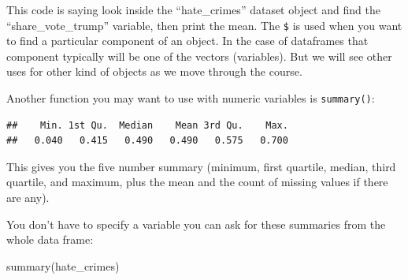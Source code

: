 \documentclass[
]{book}
\newenvironment{Shaded}{\begin{snugshade}}{\end{snugshade}}
\newcommand{\FunctionTok}[1]{\textcolor[rgb]{0.00,0.00,0.00}{#1}}
\newcommand{\NormalTok}[1]{#1}
\newcommand{\SpecialCharTok}[1]{\textcolor[rgb]{0.00,0.00,0.00}{#1}}
\begin{document}
This code is saying look inside the ``hate\_crimes'' dataset object and find the ``share\_vote\_trump'' variable, then print the mean. The \texttt{\$} is used when you want to find a particular component of an object. In the case of dataframes that component typically will be one of the vectors (variables). But we will see other uses for other kind of objects as we move through the course.

Another function you may want to use with numeric variables is \texttt{summary()}:

\begin{Shaded}
\end{Shaded}

\begin{verbatim}
##    Min. 1st Qu.  Median    Mean 3rd Qu.    Max. 
##   0.040   0.415   0.490   0.490   0.575   0.700
\end{verbatim}

This gives you the five number summary (minimum, first quartile, median, third quartile, and maximum, plus the mean and the count of missing values if there are any).

You don't have to specify a variable you can ask for these summaries from the whole data frame:

\begin{Shaded}
\begin{Highlighting}[]
\FunctionTok{summary}\NormalTok{(hate\_crimes)}
\end{Highlighting}
\end{Shaded}
\end{document}
